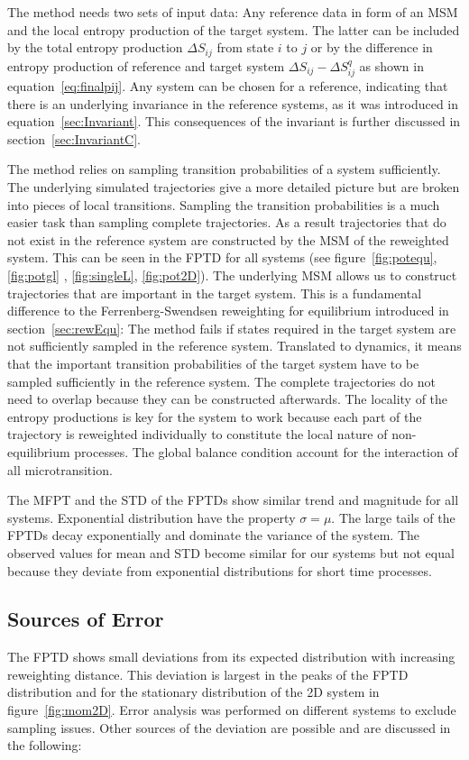 The method needs two sets of input data: Any reference data in form of an MSM and the local entropy production of the target system. The latter can be included by the total entropy production $\Delta S_{ij}$ from state $i$ to $j$ or by the difference in entropy production of reference and target system $\Delta S_{ij} - \Delta S^q_{ij}$ as shown in equation~\ref{eq:finalpij}. Any system can be chosen for a reference, indicating that there is an underlying invariance in the reference systems, as it was introduced in equation~\ref{sec:Invariant}. This consequences of the invariant is further discussed in section~\ref{sec:InvariantC}. 

The method relies on sampling transition probabilities of a system sufficiently. The underlying simulated trajectories give a more detailed picture but are broken into pieces of local transitions. Sampling the transition probabilities is a much easier task than sampling complete trajectories. As a result trajectories that do not exist in the reference system are constructed by the MSM of the reweighted system. This can be seen in the FPTD for all systems (see figure~\ref{fig:potequ}, \ref{fig:potgl} , \ref{fig:singleL}, \ref{fig:pot2D}). The underlying MSM allows us to construct trajectories that are important in the target system. This is a fundamental difference to the Ferrenberg-Swendsen reweighting for equilibrium introduced in section~\ref{sec:rewEqu}: The method fails if states required in the target system are not sufficiently sampled in the reference system. Translated to dynamics, it means that the important transition probabilities of the target system have to be sampled sufficiently in the reference system. The complete trajectories do not need to overlap because they can be constructed afterwards. The locality of the entropy productions is key for the system to work because each part of the trajectory is reweighted individually to constitute the local nature of non-equilibrium processes. The global balance condition account for the interaction of all microtransition.

The MFPT and the STD of the FPTDs show similar trend and magnitude for all systems. Exponential distribution have the property $\sigma = \mu$. The large tails of the FPTDs decay exponentially and dominate the variance of the system. The observed values for mean and STD become  similar for our systems but not equal because they deviate from exponential distributions for short time processes.  

\subsection{Sources of Error}
\label{sec:Error}
The FPTD shows small deviations from its expected distribution with increasing reweighting distance. This deviation is largest in the peaks of the FPTD distribution and for the stationary distribution of the 2D system in figure~\ref{fig:mom2D}. Error analysis was performed on different systems to exclude sampling issues. Other sources of the deviation are possible and are discussed in the following:

